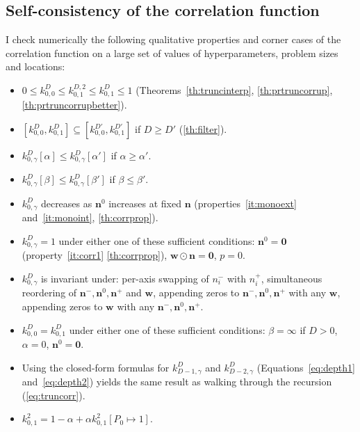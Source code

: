 \documentclass[a4paper]{article}
\newcommand{\nvecs}{\mathbf n^-, \mathbf n^0, \mathbf n^+}
\theoremstyle{definition}
\begin{document}
    \subsection{Self-consistency of the correlation function}
    \label{sec:kernelcheck}
    
    I check numerically the following qualitative properties and corner cases of the correlation function on a large set of values of hyperparameters, problem sizes and locations:
    \begin{itemize}
        
        \item $0 \le k^D_{0,0} \le k^{D,2}_{0,1} \le k^D_{0,1} \le 1$ (Theorems~\ref{th:truncinterp}, \ref{th:prtruncorrup}, \ref{th:prtruncorrupbetter}).
        
        \item $[k^D_{0,0}, k^D_{0,1}] \subseteq [k^{D'}_{0,0}, k^{D'}_{0,1}]$ if $D \ge D'$ (\autoref{th:filter}).

        \item $k^D_{0,\gamma}[\alpha] \le k^D_{0,\gamma}[\alpha']$ if $\alpha \ge \alpha'$.
        
        \item $k^D_{0,\gamma}[\beta] \le k^D_{0,\gamma}[\beta']$ if $\beta \le \beta'$.
        
        \item $k^D_{0,\gamma}$ decreases as $\mathbf n^0$ increases at fixed
        $\mathbf n$ (properties~\ref{it:monoext} and~\ref{it:monoint}, \autoref{th:corrprop}).
        
        \item $k^D_{0,\gamma} = 1$ under either one of these sufficient conditions: $\mathbf n^0 = \mathbf 0$ (property~\ref{it:corr1} \autoref{th:corrprop}), $\mathbf w \odot \mathbf n=\mathbf 0$, $p = 0$.
        
        \item $k^D_{0,\gamma}$ is invariant under: per-axis swapping of $n^-_i$
        with $n^+_i$, simultaneous reordering of $\nvecs$ and $\mathbf w$,
        appending zeros to $\nvecs$ with any $\mathbf w$, appending zeros to
        $\mathbf w$ with any $\nvecs$.
        
        \item $k^D_{0,0} = k^D_{0,1}$ under either one of these sufficient
        conditions: $\beta = \infty$ if $D > 0$, $\alpha = 0$, $\mathbf n^0 =
        \mathbf 0$.
        
        \item Using the closed-form formulas for $k^D_{D-1,\gamma}$ and $k^D_{D-2,\gamma}$ (Equations~\ref{eq:depth1} and~\ref{eq:depth2}) yields the same result as walking through the recursion (\autoref{eq:truncorr}).

        \item $k^2_{0,1} = 1 - \alpha + \alpha k^2_{0,1}[P_0\mapsto 1]$.
        
    \end{itemize}
    
\end{document}
